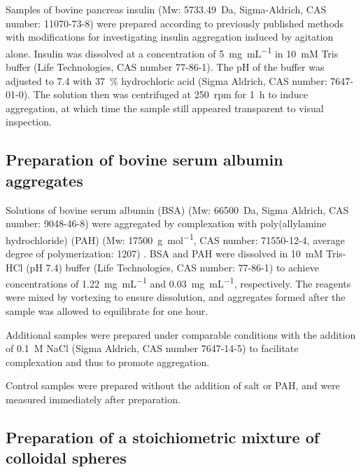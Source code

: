 Samples of bovine pancreas insulin 
(Mw: \SI{5733.49}{\dalton}, Sigma-Aldrich, CAS number: 11070-73-8) 
were prepared according to previously published methods
\cite{sluzky91,costantino94} 
with modifications for investigating insulin aggregation induced by
agitation alone.
Insulin was dissolved at a concentration of \SI{5}{\mg\per\mL}
in \SI{10}{\milli M} Tris buffer (Life Technologies, CAS
number 77-86-1). The pH of the buffer was adjusted to 7.4 with \SI{37}{\percent}
hydrochloric acid (Sigma Aldrich, CAS number: 7647-01-0).
The solution then was centrifuged at \SI{250}{rpm} for \SI{1}{\hour}
to induce aggregation, at which time the sample still appeared transparent to visual inspection.

\subsection{Preparation of bovine serum albumin aggregates}
\label{sec:bsaprep}

Solutions of bovine serum albumin
(BSA) (Mw: \SI{66500}{\dalton}, Sigma Aldrich, CAS number: 9048-46-8)
were aggregated by complexation with poly(allylamine hydrochloride)
(PAH) (Mw: \SI{17500}{\gram\per\mole}, CAS number: 71550-12-4, average
degree of polymerization: \num{1207}) \cite{ball02,hagiwara96}.
BSA and PAH were dissolved in \SI{10}{\milli M} Tris-HCl (pH 7.4) buffer
(Life Technologies, CAS number: 77-86-1) to achieve concentrations
of \SI{1.22}{\mg\per\mL} and \SI{0.03}{\mg\per\mL}, respectively.
The reagents were mixed by vortexing to ensure dissolution, and
aggregates formed after the sample was allowed to equilibrate for one
hour.

Additional samples were prepared under comparable conditions
with the addition of \SI{0.1}{M} NaCl (Sigma Aldrich, CAS number
7647-14-5) to facilitate complexation and thus to promote aggregation.

Control samples were prepared without the addition of salt or PAH, and were measured immediately after preparation.

\subsection{Preparation of a stoichiometric mixture of colloidal spheres}
\label{sec:mixture}

